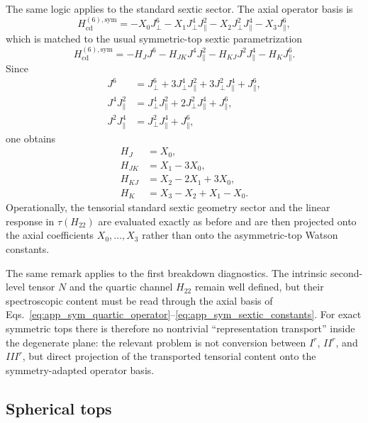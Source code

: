 \documentclass[aip,jcp,reprint,floatfix]{revtex4-2}
\begin{document}
The same logic applies to the standard sextic sector. The axial operator basis
is
\begin{equation}
H_{\mathrm{cd}}^{(6),\mathrm{sym}}
=
-X_0 J_{\perp}^6
-X_1 J_{\perp}^4 J_{\parallel}^2
-X_2 J_{\perp}^2 J_{\parallel}^4
-X_3 J_{\parallel}^6,
\label{eq:app_sym_sextic_operator}
\end{equation}
which is matched to the usual symmetric-top sextic parametrization
\begin{equation}
H_{\mathrm{cd}}^{(6),\mathrm{sym}}
=
-H_J J^6
-H_{JK} J^4 J_{\parallel}^2
-H_{KJ} J^2 J_{\parallel}^4
-H_K J_{\parallel}^6.
\end{equation}
Since
\begin{align}
J^6 &= J_{\perp}^6 + 3J_{\perp}^4J_{\parallel}^2
+ 3J_{\perp}^2J_{\parallel}^4 + J_{\parallel}^6, \\
J^4J_{\parallel}^2
&=
J_{\perp}^4J_{\parallel}^2
+ 2J_{\perp}^2J_{\parallel}^4
+ J_{\parallel}^6, \\
J^2J_{\parallel}^4
&=
J_{\perp}^2J_{\parallel}^4 + J_{\parallel}^6,
\end{align}
one obtains
\begin{align}
H_J &= X_0, \\
H_{JK} &= X_1 - 3X_0, \\
H_{KJ} &= X_2 - 2X_1 + 3X_0, \\
H_K &= X_3 - X_2 + X_1 - X_0.
\label{eq:app_sym_sextic_constants}
\end{align}
Operationally, the tensorial standard sextic geometry sector and the linear
response in $\tau(H_{22})$ are evaluated exactly as before and are then
projected onto the axial coefficients $X_0,\ldots,X_3$ rather than onto the
asymmetric-top Watson constants.

The same remark applies to the first breakdown diagnostics. The intrinsic
second-level tensor $N$ and the quartic channel $H_{22}$ remain well defined,
but their spectroscopic content must be read through the axial basis of
Eqs.~\eqref{eq:app_sym_quartic_operator}--\eqref{eq:app_sym_sextic_constants}.
For exact symmetric tops there is therefore no nontrivial
``representation transport'' inside the degenerate plane: the relevant problem
is not conversion between $I^r$, $II^r$, and $III^r$, but direct projection of
the transported tensorial content onto the symmetry-adapted operator basis.

\subsection{Spherical tops}
\end{document}
